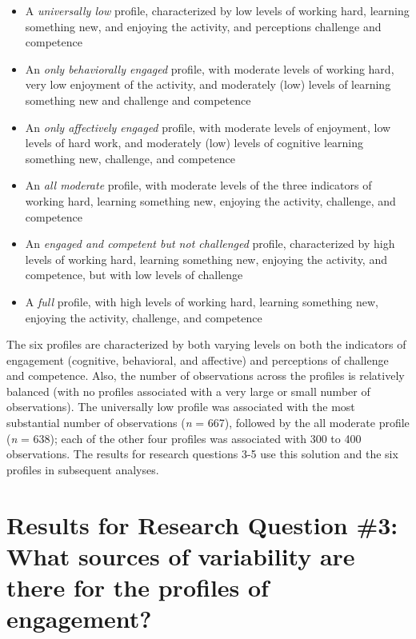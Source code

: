 \documentclass[]{msu-thesis}
\providecommand{\tightlist}{%
  \setlength{\itemsep}{0pt}\setlength{\parskip}{0pt}}
\theoremstyle{definition}
\theoremstyle{definition}
\theoremstyle{definition}
\theoremstyle{remark}
\begin{document}
\begin{itemize}
\tightlist
\item
  A \emph{universally low} profile, characterized by low levels of
  working hard, learning something new, and enjoying the activity, and
  perceptions challenge and competence
\item
  An \emph{only behaviorally engaged} profile, with moderate levels of
  working hard, very low enjoyment of the activity, and moderately (low)
  levels of learning something new and challenge and competence
\item
  An \emph{only affectively engaged} profile, with moderate levels of
  enjoyment, low levels of hard work, and moderately (low) levels of
  cognitive learning something new, challenge, and competence
\item
  An \emph{all moderate} profile, with moderate levels of the three
  indicators of working hard, learning something new, enjoying the
  activity, challenge, and competence
\item
  An \emph{engaged and competent but not challenged} profile,
  characterized by high levels of working hard, learning something new,
  enjoying the activity, and competence, but with low levels of
  challenge
\item
  A \emph{full} profile, with high levels of working hard, learning
  something new, enjoying the activity, challenge, and competence
\end{itemize}

The six profiles are characterized by both varying levels on both the
indicators of engagement (cognitive, behavioral, and affective) and
perceptions of challenge and competence. Also, the number of
observations across the profiles is relatively balanced (with no
profiles associated with a very large or small number of observations).
The universally low profile was associated with the most substantial
number of observations (\emph{n} = 667), followed by the all moderate
profile (\emph{n} = 638); each of the other four profiles was associated
with 300 to 400 observations. The results for research questions 3-5 use
this solution and the six profiles in subsequent analyses.

\section{Results for Research Question \#3: What sources of variability
are there for the profiles of
engagement?}\label{results-for-research-question-3-what-sources-of-variability-are-there-for-the-profiles-of-engagement}
\end{document}
